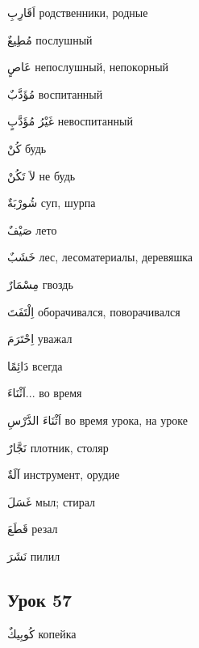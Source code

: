 \documentclass[a5paper]{article}
\newcommand\textstyleDropCaps[1]{#1}
\newcommand\textstyleCaptioncharacters[1]{#1}
\begin{document}
\textstyleCaptioncharacters{اَقَارِبِ }\textstyleDropCaps{родственники, род­ные‎}

\textstyleCaptioncharacters{مُطِيعٌ }\textstyleDropCaps{послушный‎}

\textstyleCaptioncharacters{عَاصٍ }\textstyleDropCaps{непослушный, непок­орный‎}

\textstyleCaptioncharacters{مُؤَدَّبٌ }\textstyleDropCaps{воспитанный‎}

\textstyleCaptioncharacters{غَيْرُ مُؤَدَّبٍ }\textstyleDropCaps{невоспитан­ный‎}

\textstyleCaptioncharacters{كُنْ }\textstyleDropCaps{будь‎}

\textstyleCaptioncharacters{لاَ تَكُنْ }\textstyleDropCaps{не будь‎}

\textstyleCaptioncharacters{شُورْبَةٌ }\textstyleDropCaps{суп, шурпа‎}

\textstyleCaptioncharacters{صَيْفٌ }\textstyleDropCaps{лето‎}

\textstyleCaptioncharacters{خَشَبٌ }\textstyleDropCaps{лес, лесоматериа­лы, деревяшка‎}

\textstyleCaptioncharacters{مِسْمَارٌ }\textstyleDropCaps{гвоздь‎}

\textstyleCaptioncharacters{اِلْتَفَتَ }\textstyleDropCaps{оборачивался, по­ворачивался‎}

\textstyleCaptioncharacters{اِحْتَرَمَ }\textstyleDropCaps{уважал‎}

\textstyleCaptioncharacters{دَائِمًا }\textstyleDropCaps{всегда‎}

\textstyleCaptioncharacters{اَثْنَاءَ...ِ }\textstyleDropCaps{во время‎}

\textstyleCaptioncharacters{اَثْنَاءَ الدَّرْسِ }\textstyleDropCaps{во время урока, на уроке‎}

\textstyleCaptioncharacters{نَجَّارٌ }\textstyleDropCaps{плотник, столяр‎}

\textstyleCaptioncharacters{آلَةٌ }\textstyleDropCaps{инструмент, орудие‎}

\textstyleCaptioncharacters{غَسَلَ }\textstyleDropCaps{мыл; стирал‎}

\textstyleCaptioncharacters{قَطَعَ }\textstyleDropCaps{резал‎}

\textstyleCaptioncharacters{نَشَرَ }\textstyleDropCaps{пилил‎}

\subsection[Урок 57‎]{\textstyleDropCaps{Урок 57‎}}
\textstyleCaptioncharacters{كُوبِيكٌ }\textstyleDropCaps{копейка‎}
\end{document}
